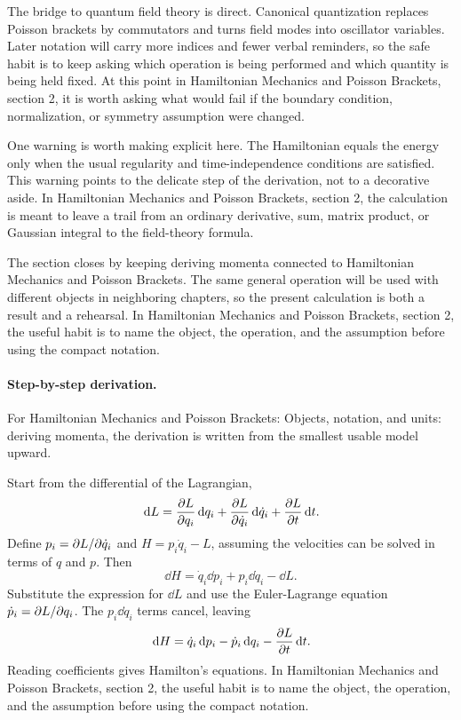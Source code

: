 The bridge to quantum field theory is direct.  Canonical quantization replaces Poisson brackets by commutators and turns field modes into oscillator variables.  Later notation will carry more indices and fewer verbal reminders, so the safe habit is to keep asking which operation is being performed and which quantity is being held fixed.  At this point in Hamiltonian Mechanics and Poisson Brackets, section 2, it is worth asking what would fail if the boundary condition, normalization, or symmetry assumption were changed.

One warning is worth making explicit here.  The Hamiltonian equals the energy only when the usual regularity and time-independence conditions are satisfied.  This warning points to the delicate step of the derivation, not to a decorative aside.  In Hamiltonian Mechanics and Poisson Brackets, section 2, the calculation is meant to leave a trail from an ordinary derivative, sum, matrix product, or Gaussian integral to the field-theory formula.

The section closes by keeping deriving momenta connected to Hamiltonian Mechanics and Poisson Brackets.  The same general operation will be used with different objects in neighboring chapters, so the present calculation is both a result and a rehearsal.  In Hamiltonian Mechanics and Poisson Brackets, section 2, the useful habit is to name the object, the operation, and the assumption before using the compact notation.



\paragraph{Step-by-step derivation.}

For Hamiltonian Mechanics and Poisson Brackets: Objects, notation, and units: deriving momenta, the derivation is written from the smallest usable model upward.

Start from the differential of the Lagrangian,
\[
  \,\mathrm d L=\frac{\partial L}{\partial q_i}\,\mathrm d q_i+\frac{\partial L}{\partial\dot q_i}\,\mathrm d\dot q_i+\frac{\partial L}{\partial t}\,\mathrm d t.
\]
Define \(p_i=\partial L/\partial\dot q_i\) and \(H=p_i\dot q_i-L\), assuming the velocities can be solved in terms of \(q\) and \(p\).  Then
\[
  \dd H=\dot q_i\dd p_i+p_i\dd\dot q_i-\dd L.
\]
Substitute the expression for \(\dd L\) and use the Euler-Lagrange equation \(\dot p_i=\partial L/\partial q_i\).  The \(p_i\dd\dot q_i\) terms cancel, leaving
\[
  \,\mathrm d H=\dot q_i\,\mathrm d p_i-\dot p_i\,\mathrm d q_i-\frac{\partial L}{\partial t}\,\mathrm d t.
\]
Reading coefficients gives Hamilton's equations.  In Hamiltonian Mechanics and Poisson Brackets, section 2, the useful habit is to name the object, the operation, and the assumption before using the compact notation.

